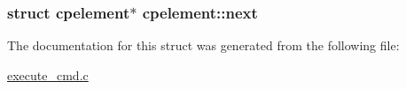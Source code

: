 \subsubsection[{\texorpdfstring{next}{next}}]{\setlength{\rightskip}{0pt plus 5cm}struct {\bf cpelement}$\ast$ cpelement\+::next}\hypertarget{structcpelement_aad9f602c3450059111014c2c7d95e201}{}\label{structcpelement_aad9f602c3450059111014c2c7d95e201}


The documentation for this struct was generated from the following file\+:\begin{DoxyCompactItemize}
\item 
\hyperlink{execute__cmd_8c}{execute\+\_\+cmd.\+c}\end{DoxyCompactItemize}
